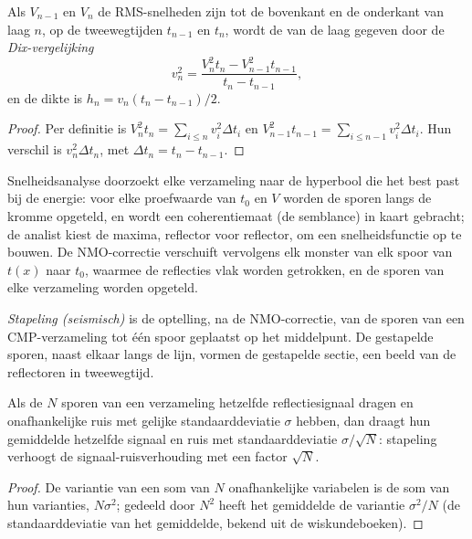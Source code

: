 \begin{theorem}\label{thm:b3:exploration-seismology:dix}
Als $V_{n-1}$ en $V_n$ de RMS-snelheden zijn tot de bovenkant en de onderkant van laag
$n$, op de tweewegtijden $t_{n-1}$ en $t_n$, wordt de  van de
laag gegeven door de \emph{Dix-vergelijking}
\[
  v_n^2 = \frac{V_n^2t_n - V_{n-1}^2t_{n-1}}{t_n - t_{n-1}} ,
\]
en de dikte is $h_n = v_n(t_n - t_{n-1})/2$.
\end{theorem}

\begin{proof}
Per definitie is $V_n^2t_n = \sum_{i\le n}v_i^2\Delta t_i$ en $V_{n-1}^2t_{n-1}
= \sum_{i\le n-1}v_i^2\Delta t_i$. Hun verschil is $v_n^2\Delta t_n$, met
$\Delta t_n = t_n - t_{n-1}$.
\end{proof}

Snelheidsanalyse doorzoekt elke verzameling naar de hyperbool die het best past bij de
energie: voor elke proefwaarde van $t_0$ en $V$ worden de sporen langs de kromme opgeteld, en
wordt een coherentiemaat (de semblance) in kaart gebracht; de analist kiest de maxima,
reflector voor reflector, om een snelheidsfunctie op te bouwen. De NMO-correctie
verschuift vervolgens elk monster van elk spoor van $t(x)$ naar $t_0$, waarmee de
reflecties vlak worden getrokken, en de sporen van elke verzameling worden opgeteld.

\begin{definition}\label{def:b3:exploration-seismology:stack}
\emph{Stapeling (seismisch)} is de optelling, na de
NMO-correctie, van de sporen van een CMP-verzameling tot één spoor
geplaatst op het middelpunt. De gestapelde sporen, naast elkaar langs de lijn, vormen
de gestapelde sectie, een beeld van de reflectoren in tweewegtijd.
\end{definition}

\begin{proposition}\label{prop:b3:exploration-seismology:sqrtN}
Als de $N$ sporen van een verzameling hetzelfde reflectiesignaal dragen en onafhankelijke
ruis met gelijke standaarddeviatie $\sigma$ hebben, dan draagt hun gemiddelde hetzelfde signaal
en ruis met standaarddeviatie $\sigma/\sqrt N$: stapeling verhoogt de
signaal-ruisverhouding met een factor $\sqrt N$.
\end{proposition}

\begin{proof}
De variantie van een som van $N$ onafhankelijke variabelen is de som van hun
varianties, $N\sigma^2$; gedeeld door $N^2$ heeft het gemiddelde de variantie
$\sigma^2/N$ (de standaarddeviatie van het gemiddelde, bekend uit de
wiskundeboeken).
\end{proof}

